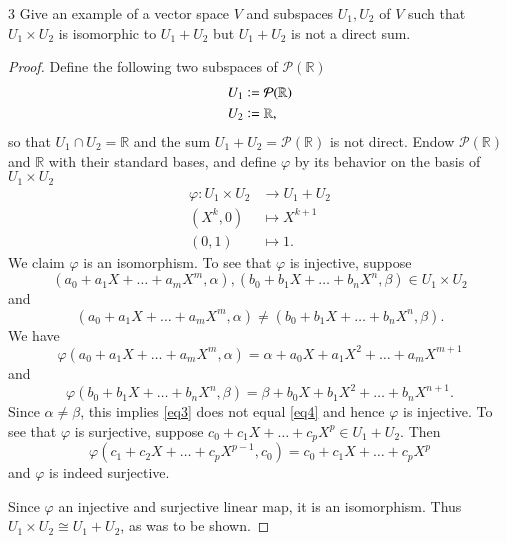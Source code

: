 \documentclass[11pt]{extarticle}
\newenvironment{problem}[1]{\begin{prob*}{#1}{}}{\end{prob*}}
\newcommand{\R}{\mathbb{R}}
\newcommand{\poly}{\mathcal{P}}
\newcommand{\defeq}{\vcentcolon=}
\begin{document}
\begin{problem}{3}
Give an example of a vector space $V$ and subspaces $U_1,U_2$ of $V$ such that $U_1\times U_2$ is isomorphic to $U_1 + U_2$ but $U_1 + U_2$ is not a direct sum.
\end{problem}
\begin{proof}
Define the following two subspaces of $\poly(\R)$
\begin{align*}
U_1 &\defeq \poly(\R)\\
U_2 &\defeq \R,
\end{align*}
so that $U_1\cap U_2 = \R$ and the sum $U_1 + U_2 = \poly(\R)$ is not direct.  Endow $\poly(\R)$ and $\R$ with their standard bases, and define $\varphi$ by its behavior on the basis of $U_1\times U_2$
\begin{align*}
\varphi:U_1\times U_2 &\to U_1 + U_2\\
            \left(X^k, 0\right) &\mapsto X^{k + 1}\\
            (0, 1) &\mapsto 1.
\end{align*}
We claim $\varphi$ is an isomorphism.  To see that $\varphi$ is injective, suppose 
\begin{equation*}
\left(a_0 + a_1X + \dots + a_mX^m, \alpha\right), \left(b_0 + b_1X + \dots + b_nX^n, \beta\right)\in U_1\times U_2
\end{equation*}
and 
\begin{equation*}
\left(a_0 + a_1X + \dots + a_mX^m, \alpha\right) \neq \left(b_0 + b_1X + \dots + b_nX^n, \beta\right).
\end{equation*}
We have
\begin{equation}\label{eq3}
\varphi\left(a_0 + a_1X + \dots + a_mX^m, \alpha\right) = \alpha + a_0X + a_1X^2 + \dots + a_mX^{m + 1}
\end{equation}
and 
\begin{equation}\label{eq4}
\varphi\left(b_0 + b_1X + \dots + b_nX^n, \beta\right) = \beta + b_0X + b_1X^2 + \dots + b_nX^{n + 1}.
\end{equation}
Since $\alpha\neq \beta$, this implies \eqref{eq3} does not equal \eqref{eq4} and hence $\varphi$ is injective.  To see that $\varphi$ is surjective, suppose $c_0 + c_1X + \dots + c_pX^p\in U_1 + U_2$.  Then 
\begin{equation*}
\varphi\left(c_1 + c_2X + \dots + c_pX^{p - 1}, c_0\right) = c_0 + c_1X + \dots + c_pX^p
\end{equation*}
and $\varphi$ is indeed surjective.  
\par Since $\varphi$ an injective and surjective linear map, it is an isomorphism.  Thus $U_1\times U_2\cong U_1 + U_2$, as was to be shown.
\end{proof}
\end{document}
